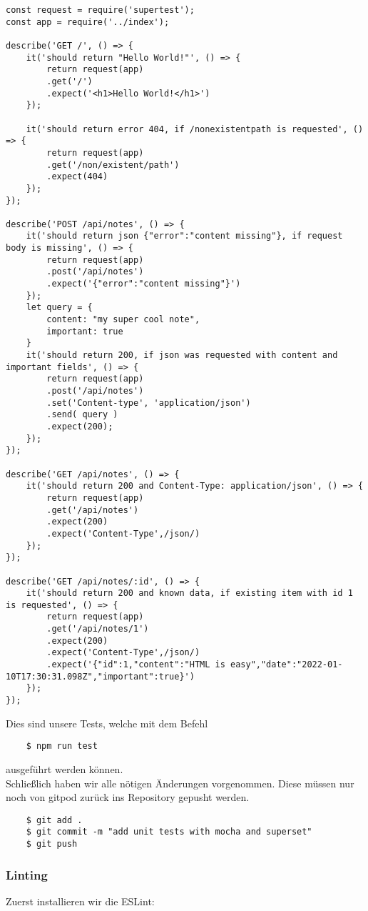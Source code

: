 \begin{verbatim}
const request = require('supertest');
const app = require('../index');

describe('GET /', () => {
	it('should return "Hello World!"', () => {
		return request(app)
		.get('/')
		.expect('<h1>Hello World!</h1>')
	});
	
	it('should return error 404, if /nonexistentpath is requested', () => {
		return request(app)
		.get('/non/existent/path')
		.expect(404)
	});
});

describe('POST /api/notes', () => {
	it('should return json {"error":"content missing"}, if request body is missing', () => {
		return request(app)
		.post('/api/notes')
		.expect('{"error":"content missing"}')
	});
	let query = {
		content: "my super cool note",
		important: true
	}
	it('should return 200, if json was requested with content and important fields', () => {
		return request(app)
		.post('/api/notes')
		.set('Content-type', 'application/json')
		.send( query )
		.expect(200);
	});
});

describe('GET /api/notes', () => {
	it('should return 200 and Content-Type: application/json', () => {
		return request(app)
		.get('/api/notes')
		.expect(200)
		.expect('Content-Type',/json/)
	});
});

describe('GET /api/notes/:id', () => {
	it('should return 200 and known data, if existing item with id 1 is requested', () => {
		return request(app)
		.get('/api/notes/1')
		.expect(200)
		.expect('Content-Type',/json/)
		.expect('{"id":1,"content":"HTML is easy","date":"2022-01-10T17:30:31.098Z","important":true}')
	});
});
\end{verbatim}

\noindent
Dies sind unsere Tests, welche mit dem Befehl

\begin{verbatim}
	$ npm run test
\end{verbatim}

\noindent
ausgeführt werden können. \\

\noindent
Schließlich haben wir alle nötigen Änderungen vorgenommen.
Diese müssen nur noch von gitpod zurück ins Repository gepusht werden.

\begin{verbatim}
	$ git add .
	$ git commit -m "add unit tests with mocha and superset"
	$ git push
\end{verbatim}


\subsubsection{Linting}
Zuerst installieren wir die ESLint:

